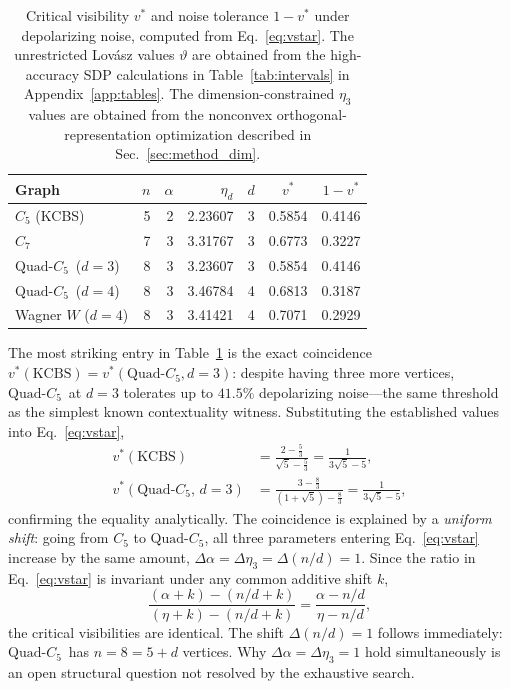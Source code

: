 \documentclass[aps,pra,twocolumn,superscriptaddress,longbibliography,floatfix]{revtex4-2}
\newcommand{\vt}{\vartheta}
\newcommand{\al}{\alpha}
\newcommand{\QC}{\ensuremath{\text{Quad-}C_5}}
\begin{document}
\begin{table}[tp]
  \caption{Critical visibility $v^*$ and noise tolerance $1-v^*$ under
           depolarizing noise, computed from Eq.~\eqref{eq:vstar}.
           The unrestricted Lov\'{a}sz values $\vt$ are obtained from the
           high-accuracy SDP calculations in Table~\ref{tab:intervals} in Appendix~\ref{app:tables}.
           The dimension-constrained $\eta_3$ values are obtained from the
           nonconvex orthogonal-representation optimization described in
           Sec.~\ref{sec:method_dim}.}
  \label{tab:noise}
  \begin{ruledtabular}
  \begin{tabular}{lrrrr cc}
    Graph & $n$ & $\al$ & $\eta_d$ & $d$ & $v^*$ & $1-v^*$ \\
    \hline
    $C_5$ (KCBS)        & 5 & 2 & 2.23607 & 3 & 0.5854 & 0.4146 \\
    $C_7$               & 7 & 3 & 3.31767 & 3 & 0.6773 & 0.3227 \\
    \QC\ ($d=3$)        & 8 & 3 & 3.23607 & 3 & 0.5854 & 0.4146 \\
    \QC\ ($d=4$)        & 8 & 3 & 3.46784 & 4 & 0.6813 & 0.3187 \\
    Wagner $W$ ($d=4$)  & 8 & 3 & 3.41421 & 4 & 0.7071 & 0.2929 \\
  \end{tabular}
  \end{ruledtabular}
\end{table}

The most striking entry in Table~\ref{tab:noise} is the exact coincidence
$v^*(\text{KCBS})=v^*(\QC,d{=}3)$: despite having three more vertices,
\QC\ at $d=3$ tolerates up to $41.5\%$ depolarizing noise---the same
threshold as the simplest known contextuality witness.
Substituting the established values into Eq.~\eqref{eq:vstar},
\begin{align}
  v^*(\text{KCBS}) &= \frac{2-\tfrac{5}{3}}{\sqrt{5}-\tfrac{5}{3}}
                    = \frac{1}{3\sqrt{5}-5}, \label{eq:vstar_kcbs}\\[2pt]
  v^*(\QC,\,d{=}3) &= \frac{3-\tfrac{8}{3}}{(1+\sqrt{5})-\tfrac{8}{3}}
                    = \frac{1}{3\sqrt{5}-5}, \label{eq:vstar_qc}
\end{align}
confirming the equality analytically.
The coincidence is explained by a \emph{uniform shift}: going from $C_5$
to \QC, all three parameters entering Eq.~\eqref{eq:vstar} increase
by the same amount, $\Delta\al=\Delta\eta_3=\Delta(n/d)=1$.
Since the ratio in Eq.~\eqref{eq:vstar} is invariant under any common
additive shift $k$,
\begin{equation}
  \frac{(\al+k)-(n/d+k)}{(\eta+k)-(n/d+k)} = \frac{\al-n/d}{\eta-n/d},
  \label{eq:shift_invariance}
\end{equation}
the critical visibilities are identical.
The shift $\Delta(n/d)=1$ follows immediately: \QC\ has $n=8=5+d$ vertices.
Why $\Delta\al=\Delta\eta_3=1$ hold simultaneously is an open structural question
not resolved by the exhaustive search.
\end{document}
